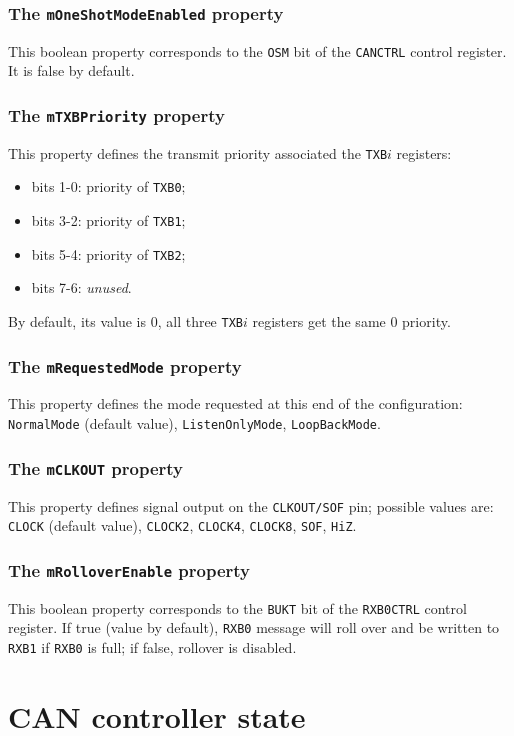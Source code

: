 \documentclass[10pt, a4paper, obeyspaces]{extarticle}
\newcommand \sectionLabel[2]{\section{#1}\label{sec:#2}}
\newcommand \subsubsectionLabel[2]{\subsubsection{#1}\label{subsubsec:#2}}
\begin{document}
\subsubsectionLabel{The \texttt{mOneShotModeEnabled} property}{mOneShotModeEnabled}

This boolean property corresponds to the \texttt{OSM} bit of the \texttt{CANCTRL} control register. It is false by default.



\subsubsectionLabel{The \texttt{mTXBPriority} property}{mTXBPriority}

This property defines the transmit priority associated the \texttt{TXB$i$} registers:
\begin{itemize}
  \item bits 1-0: priority of \texttt{TXB0};
  \item bits 3-2: priority of \texttt{TXB1};
  \item bits 5-4: priority of \texttt{TXB2};
  \item bits 7-6: \emph{unused}.
\end{itemize}

By default, its value is $0$, all three \texttt{TXB$i$} registers get the same $0$ priority.



\subsubsectionLabel{The \texttt{mRequestedMode} property}{mRequestedMode}

This property defines the mode requested at this end of the configuration: \texttt{NormalMode} (default value), \texttt{ListenOnlyMode}, \texttt{LoopBackMode}.





\subsubsectionLabel{The \texttt{mCLKOUT} property}{mCLKOUT}

This property defines signal output on the \texttt{CLKOUT/SOF} pin; possible values are: \texttt{CLOCK} (default value), \texttt{CLOCK2}, \texttt{CLOCK4}, \texttt{CLOCK8}, \texttt{SOF}, \texttt{HiZ}.



\subsubsectionLabel{The \texttt{mRolloverEnable} property}{mRolloverEnable}

This boolean property corresponds to the \texttt{BUKT} bit of the \texttt{RXB0CTRL} control register. If true (value by default), \texttt{RXB0} message will roll over and be written to \texttt{RXB1} if \texttt{RXB0} is full; if false, rollover is disabled.











\sectionLabel{CAN controller state}{canControllerState}
\end{document}
